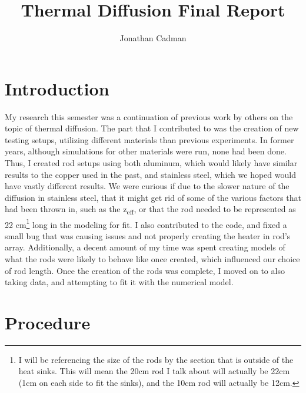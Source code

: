 \documentclass[11pt,a4paper,notitlepage,fleqn]{article}
\title{Thermal Diffusion Final Report}
\author{Jonathan Cadman}
\begin{document}
	\maketitle
	\section{Introduction}
	My research this semester was a continuation of previous work by others on the topic of thermal diffusion. The part that I contributed to was the creation of new testing setups, utilizing different materials than previous experiments. In former years, although simulations for other materials were run, none had been done. Thus, I created rod setups using both aluminum, which would likely have similar results to the copper used in the past, and stainless steel, which we hoped would have vastly different results. We were curious if due to the slower nature of the diffusion in stainless steel, that it might get rid of some of the various factors that had been thrown in, such as the z\textsubscript{eff}, or that the rod needed to be represented as 22 cm\footnote{I will be referencing the size of the rods by the section that is outside of the heat sinks. This will mean the 20cm rod I talk about will actually be 22cm (1cm on each side to fit the sinks), and the 10cm rod will actually be 12cm.} long in the modeling for fit. I also contributed to the code, and fixed a small bug that was causing issues and not properly creating the heater in rod's array. Additionally, a decent amount of my time was spent creating models of what the rods were likely to behave like once created, which influenced our choice of rod length. Once the creation of the rods was complete, I moved on to also taking data, and attempting to fit it with the numerical model.
	\section{Procedure}
\end{document}
